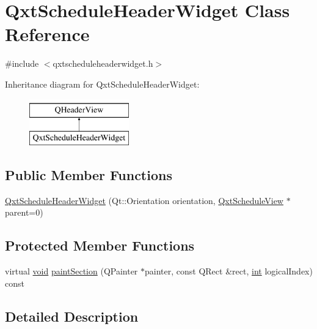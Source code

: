 \hypertarget{class_qxt_schedule_header_widget}{\section{Qxt\-Schedule\-Header\-Widget Class Reference}
\label{class_qxt_schedule_header_widget}
}


{\ttfamily \#include $<$qxtscheduleheaderwidget.\-h$>$}

Inheritance diagram for Qxt\-Schedule\-Header\-Widget\-:\begin{figure}[H]
\begin{center}
\leavevmode
\includegraphics[height=2.000000cm]{class_qxt_schedule_header_widget}
\end{center}
\end{figure}
\subsection*{Public Member Functions}
\begin{DoxyCompactItemize}
\item 
\hyperlink{class_qxt_schedule_header_widget_a9c3c41738e32c79b024e35146857ffd8}{Qxt\-Schedule\-Header\-Widget} (Qt\-::\-Orientation orientation, \hyperlink{class_qxt_schedule_view}{Qxt\-Schedule\-View} $\ast$parent=0)
\end{DoxyCompactItemize}
\subsection*{Protected Member Functions}
\begin{DoxyCompactItemize}
\item 
virtual \hyperlink{group___u_a_v_objects_plugin_ga444cf2ff3f0ecbe028adce838d373f5c}{void} \hyperlink{class_qxt_schedule_header_widget_af4a24ea157cbf030bf5eb3e3ef68048d}{paint\-Section} (Q\-Painter $\ast$painter, const Q\-Rect \&rect, \hyperlink{ioapi_8h_a787fa3cf048117ba7123753c1e74fcd6}{int} logical\-Index) const 
\end{DoxyCompactItemize}


\subsection{Detailed Description}


